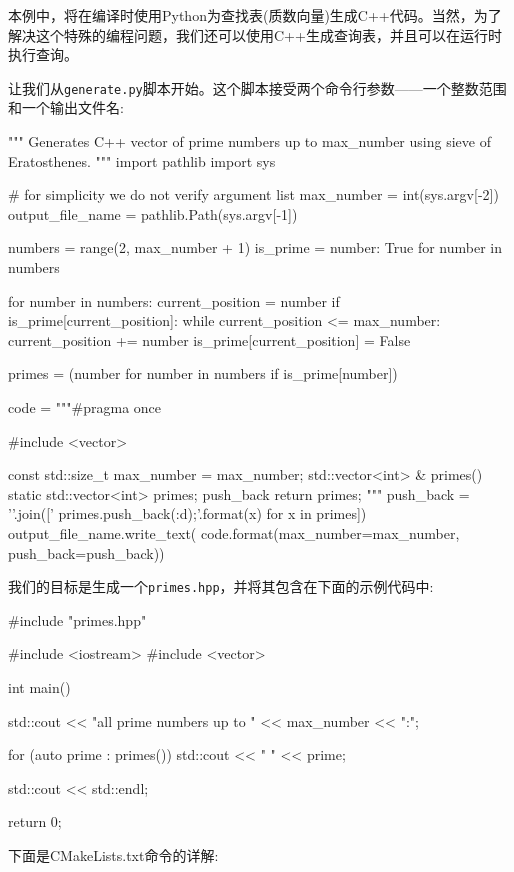 本例中，将在编译时使用Python为查找表(质数向量)生成C++代码。当然，为了解决这个特殊的编程问题，我们还可以使用C++生成查询表，并且可以在运行时执行查询。

让我们从\texttt{generate.py}脚本开始。这个脚本接受两个命令行参数——一个整数范围和一个输出文件名:

\begin{codebox}[python]
"""
Generates C++ vector of prime numbers up to max_number
using sieve of Eratosthenes.
"""
import pathlib
import sys

# for simplicity we do not verify argument list
max_number = int(sys.argv[-2])
output_file_name = pathlib.Path(sys.argv[-1])

numbers = range(2, max_number + 1)
is_prime = {number: True for number in numbers}

for number in numbers:
  current_position = number
  if is_prime[current_position]:
    while current_position <= max_number:
      current_position += number
      is_prime[current_position] = False
      
primes = (number for number in numbers if is_prime[number])

code = """#pragma once

#include <vector>

const std::size_t max_number = {max_number};
std::vector<int> & primes() {{
  static std::vector<int> primes;
  {push_back}
  return primes;
}}
"""
push_back = '\n'.join([' primes.push_back({:d});'.format(x) for x in primes])
output_file_name.write_text(
code.format(max_number=max_number, push_back=push_back))
\end{codebox}

我们的目标是生成一个\texttt{primes.hpp}，并将其包含在下面的示例代码中:

\begin{codebox}[cpp]
#include "primes.hpp"

#include <iostream>
#include <vector>

int main() {
  std::cout << "all prime numbers up to " << max_number << ":";
  
  for (auto prime : primes())
    std::cout << " " << prime;
  
  std::cout << std::endl;
  
  return 0;
}
\end{codebox}


下面是CMakeLists.txt命令的详解:

